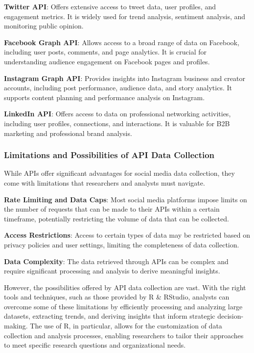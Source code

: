 \documentclass[
]{book}
\begin{document}
\textbf{Twitter API}: Offers extensive access to tweet data, user profiles, and engagement metrics. It is widely used for trend analysis, sentiment analysis, and monitoring public opinion.

\textbf{Facebook Graph API}: Allows access to a broad range of data on Facebook, including user posts, comments, and page analytics. It is crucial for understanding audience engagement on Facebook pages and profiles.

\textbf{Instagram Graph API}: Provides insights into Instagram business and creator accounts, including post performance, audience data, and story analytics. It supports content planning and performance analysis on Instagram.

\textbf{LinkedIn API}: Offers access to data on professional networking activities, including user profiles, connections, and interactions. It is valuable for B2B marketing and professional brand analysis.

\hypertarget{limitations-and-possibilities-of-api-data-collection}{%
\subsubsection*{Limitations and Possibilities of API Data Collection}\label{limitations-and-possibilities-of-api-data-collection}}

While APIs offer significant advantages for social media data collection, they come with limitations that researchers and analysts must navigate.

\textbf{Rate Limiting and Data Caps}: Most social media platforms impose limits on the number of requests that can be made to their APIs within a certain timeframe, potentially restricting the volume of data that can be collected.

\textbf{Access Restrictions}: Access to certain types of data may be restricted based on privacy policies and user settings, limiting the completeness of data collection.

\textbf{Data Complexity}: The data retrieved through APIs can be complex and require significant processing and analysis to derive meaningful insights.

However, the possibilities offered by API data collection are vast. With the right tools and techniques, such as those provided by R \& RStudio, analysts can overcome some of these limitations by efficiently processing and analyzing large datasets, extracting trends, and deriving insights that inform strategic decision-making. The use of R, in particular, allows for the customization of data collection and analysis processes, enabling researchers to tailor their approaches to meet specific research questions and organizational needs.
\end{document}
